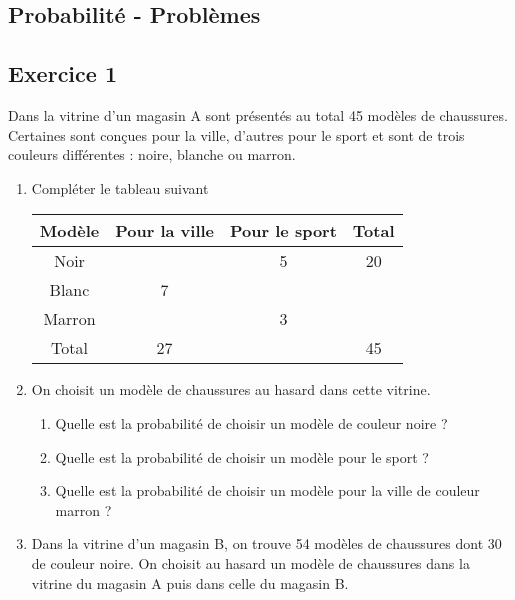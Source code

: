 \documentclass[10pt,a4paper,landscape]{article}
\begin{document}

\newtheorem{Definition}{Définition}
\newtheorem{Theorem}{Théorème}
\newtheorem{Proposition}{Propriété}

\renewcommand{\labelitemi}{$\bullet$}
\renewcommand{\labelitemii}{$\circ$}

\setlength{\columnseprule}{1pt}

\begin{multicols}{3}
\section*{Probabilité - Problèmes}

\subsection*{Exercice 1}
Dans la vitrine d’un magasin A sont présentés au total 45 modèles de chaussures. Certaines sont conçues pour la ville, d’autres pour le sport et sont de trois couleurs différentes : noire, blanche ou marron. 

\begin{enumerate}
\item Compléter le tableau suivant 

\begin{center}
      \begin{tabular}{|c|c|c|c|} \hline

Modèle 	&Pour la ville 	&Pour le sport 	&Total\\ \hline
Noir 	&				&5				&20\\ \hline
Blanc	&7				&				&\\ \hline
Marron	&				&3				&\\ \hline
Total 	&27				&				&45\\ \hline
\end{tabular}
\end{center}

\item On choisit un modèle de chaussures au hasard dans cette vitrine.
\begin{enumerate}
    \item Quelle est la probabilité de choisir un modèle de couleur noire ?
    \item Quelle est la probabilité de choisir un modèle pour le sport ?
    \item Quelle est la probabilité de choisir un modèle pour la ville de couleur marron ?
\end{enumerate}
\item Dans la vitrine d’un magasin B, on trouve 54 modèles de chaussures dont 30 de couleur noire. On choisit au hasard un modèle de chaussures dans la vitrine du magasin A puis dans celle du magasin B.


\end{enumerate}
\end{multicols}
\end{document}
